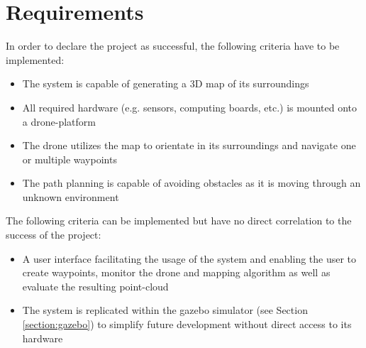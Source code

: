 \section{Requirements}
In order to declare the project as successful, the following criteria have to be implemented:
\begin{itemize}
	\item The system is capable of generating a 3D map of its surroundings
	\item All required hardware (e.g. sensors, computing boards, etc.) is mounted onto a drone-platform 
	\item The drone utilizes the map to orientate in its surroundings and navigate one or multiple waypoints
	\item The path planning is capable of avoiding obstacles as it is moving through an unknown environment
\end{itemize}

The following criteria can be implemented but have no direct correlation to the success of the project:
\begin{itemize}
	\item A user interface facilitating the usage of the system and enabling the user to create waypoints, monitor the drone and mapping algorithm as well as evaluate the resulting point-cloud
	\item The system is replicated within the gazebo simulator (see Section \ref{section:gazebo}) to simplify future development without direct access to its hardware
\end{itemize} 


\filbreak
